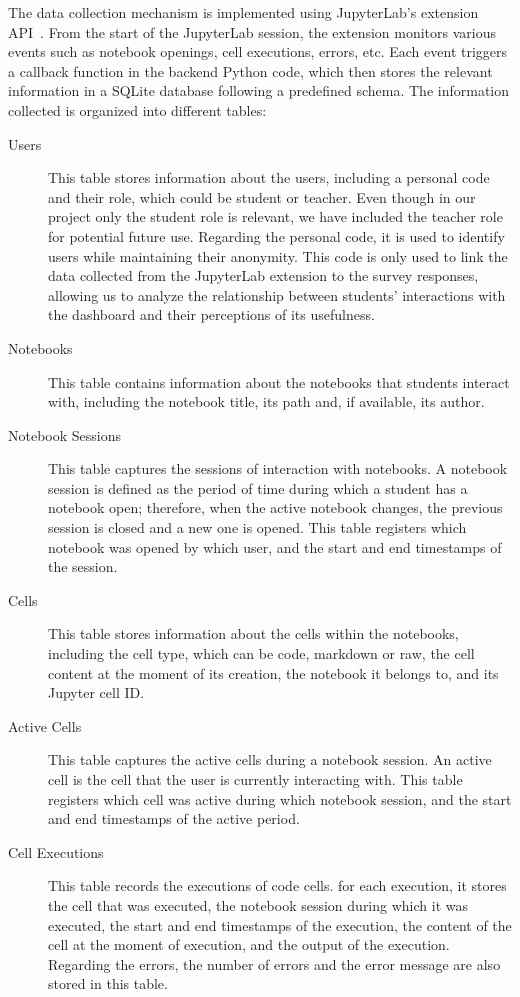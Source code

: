 The data collection mechanism is implemented using JupyterLab's extension API~\cite{jupyterlab_tutorial_2024, jupyterlab_extension_template}. From the start of the JupyterLab session, the extension monitors various events such as notebook openings, cell executions, errors, etc. Each event triggers a callback function in the backend Python code, which then stores the relevant information in a SQLite database following a predefined schema. The information collected is organized into different tables:
\begin{description}
    \item[Users] This table stores information about the users, including a personal code and their role, which could be student or teacher. Even though in our project only the student role is relevant, we have included the teacher role for potential future use. Regarding the personal code, it is used to identify users while maintaining their anonymity. This code is only used to link the data collected from the JupyterLab extension to the survey responses, allowing us to analyze the relationship between students' interactions with the dashboard and their perceptions of its usefulness.
    
    \item[Notebooks] This table contains information about the notebooks that students interact with, including the notebook title, its path and, if available, its author.
    
    \item[Notebook Sessions] This table captures the sessions of interaction with notebooks. A notebook session is defined as the period of time during which a student has a notebook open; therefore, when the active notebook changes, the previous session is closed and a new one is opened. This table registers which notebook was opened by which user, and the start and end timestamps of the session.
    
    \item[Cells] This table stores information about the cells within the notebooks, including the cell type, which can be code, markdown or raw, the cell content at the moment of its creation, the notebook it belongs to, and its Jupyter cell ID.
    
    \item[Active Cells] This table captures the active cells during a notebook session. An active cell is the cell that the user is currently interacting with. This table registers which cell was active during which notebook session, and the start and end timestamps of the active period.
    
    \item[Cell Executions] This table records the executions of code cells. for each execution, it stores the cell that was executed, the notebook session during which it was executed, the start and end timestamps of the execution, the content of the cell at the moment of execution, and the output of the execution. Regarding the errors, the number of errors and the error message are also stored in this table.
\end{description}

